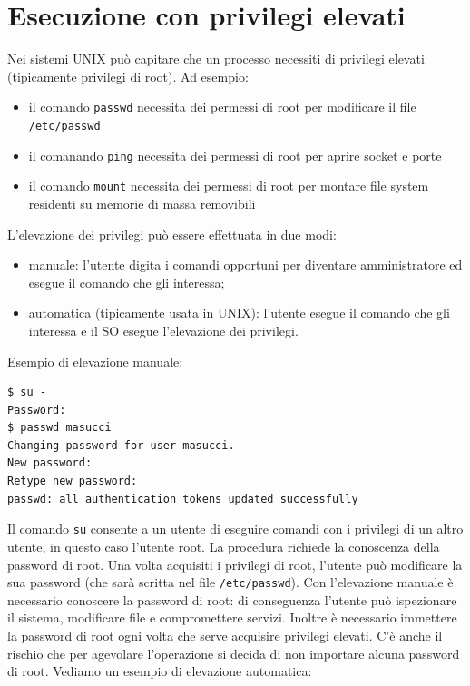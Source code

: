 \chapter{Esecuzione con privilegi elevati}
Nei sistemi UNIX può capitare che un processo necessiti di privilegi elevati (tipicamente privilegi di root). Ad esempio:
\begin{itemize}
    \item il comando \texttt{passwd} necessita dei permessi di root per modificare il file \texttt{/etc/passwd}
    \item il comanando \texttt{ping} necessita dei permessi di root per aprire socket e porte 
    \item il comando \texttt{mount} necessita dei permessi di root per montare file system residenti su memorie di massa removibili
\end{itemize}
L'elevazione dei privilegi può essere effettuata in due modi:
\begin{itemize}
    \item manuale: l'utente digita i comandi opportuni per diventare amministratore ed esegue il comando che gli interessa;
    \item automatica (tipicamente usata in UNIX): l'utente esegue il comando che gli interessa e il SO esegue l'elevazione dei privilegi.
\end{itemize}
Esempio di elevazione manuale:
\begin{mdframed}[backgroundcolor=white!20,shadow=false]
\begin{lstlisting}
$ su -
Password:
$ passwd masucci
Changing password for user masucci.
New password:
Retype new password:
passwd: all authentication tokens updated successfully
\end{lstlisting}

\end{mdframed}

Il comando \texttt{su} consente a un utente di eseguire comandi con i privilegi di un altro utente, in questo caso l'utente root. La procedura richiede la conoscenza della password di root. Una volta acquisiti i privilegi di root, l'utente può modificare la sua password (che sarà scritta nel file \texttt{/etc/passwd}). Con l'elevazione manuale è necessario conoscere la password di root: di conseguenza l'utente può ispezionare il sistema, modificare file e compromettere servizi. Inoltre è necessario immettere la password di root ogni volta che serve acquisire privilegi elevati. C'è anche il rischio che per agevolare l'operazione si decida di non importare alcuna password di root. Vediamo un esempio di elevazione automatica:

